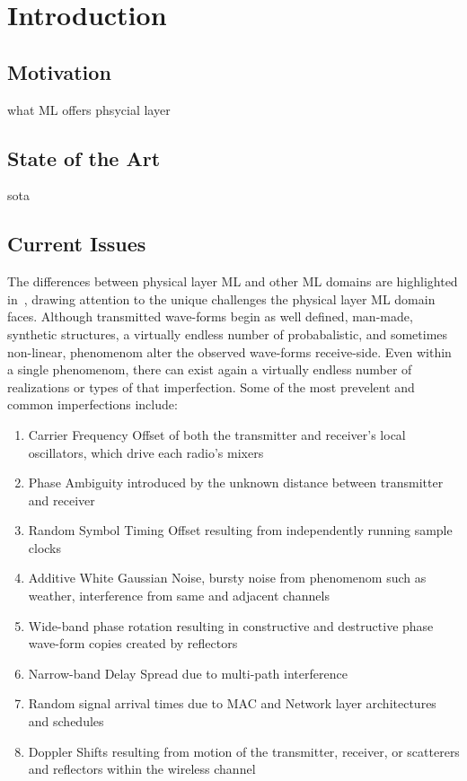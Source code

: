 \chapter{Introduction}
\label{ch:introduction}
\section{Motivation}
what ML offers phsycial layer

\section{State of the Art}
sota

\section{Current Issues}
The differences between physical layer ML and other ML domains are highlighted in~\cite{o2016radio}, drawing attention to the unique challenges the physical layer ML domain faces. Although transmitted wave-forms begin as well defined, man-made, synthetic structures, a virtually endless number of probabalistic, and sometimes non-linear, phenomenom alter the observed wave-forms receive-side. Even within a single phenomenom, there can exist again a virtually endless number of realizations or types of that imperfection. Some of the most prevelent and common imperfections include:
\begin{enumerate}
	\item Carrier Frequency Offset of both the transmitter and receiver's local oscillators, which drive each radio's mixers
	\item Phase Ambiguity introduced by the unknown distance between transmitter and receiver
	\item Random Symbol Timing Offset resulting from independently running sample clocks
	\item Additive White Gaussian Noise, bursty noise from phenomenom such as weather, interference from same and adjacent channels
	\item Wide-band phase rotation resulting in constructive and destructive phase wave-form copies created by reflectors
	\item Narrow-band Delay Spread due to multi-path interference
	\item Random signal arrival times due to MAC and Network layer architectures and schedules
	\item Doppler Shifts resulting from motion of the transmitter, receiver, or scatterers and reflectors within the wireless channel
\end{enumerate}
